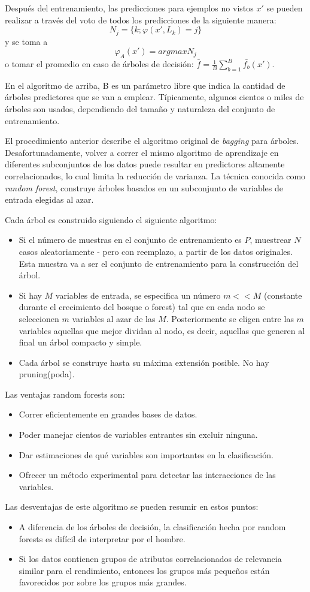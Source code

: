 	Después del entrenamiento, las predicciones para ejemplos no vistos $x'$ se pueden realizar a través del voto de todos los predicciones de la siguiente manera:
	$$N_j = \{ k;\varphi(x', L_k) = j \}$$
	y se toma a
	$$\varphi_A(x') = argmax N_j$$
	o tomar el promedio en caso de árboles de decisión: $\bar{f} = \frac{1}{B}\sum_{b=1}^B\bar{f_b}(x')$.

	En el algoritmo de arriba, B es un parámetro libre que indica la cantidad de árboles predictores que se van a emplear. Típicamente, algunos cientos o miles de árboles son usados, dependiendo del tamaño y naturaleza del conjunto de entrenamiento.

	El procedimiento anterior describe el algoritmo original de \textit{bagging} para árboles. Desafortunadamente, volver a correr el mismo algoritmo de aprendizaje en diferentes subconjuntos de los datos puede resultar en predictores altamente correlacionados, lo cual limita la reducción de varianza. La técnica conocida como \textit{random forest}, construye árboles basados en un subconjunto de variables de entrada elegidas al azar.

	Cada árbol es construido siguiendo el siguiente algoritmo:
	\begin{itemize}
		\item Si el número de muestras en el conjunto de entrenamiento es $P$, muestrear $N$ casos aleatoriamente - pero con reemplazo, a partir de los datos originales. Esta muestra va a ser el conjunto de entrenamiento para la construcción del árbol.
		\item Si hay $M$ variables de entrada, se especifica un número $m<<M$ (constante durante el crecimiento del bosque o forest) tal que en cada nodo se seleccionen $m$ variables al azar de las $M$. Posteriormente se eligen entre las $m$ variables aquellas que mejor dividan al nodo, es decir, aquellas que generen al final un árbol compacto y simple.
		\item Cada árbol se construye hasta su máxima extensión posible. No hay pruning(poda).
	\end{itemize}
	Las ventajas random forests son:
	\begin{itemize}
		\item Correr eficientemente en grandes bases de datos.
		\item Poder manejar cientos de variables entrantes sin excluir ninguna.
		\item Dar estimaciones de qué variables son importantes en la clasificación.
		\item Ofrecer un método experimental para detectar las interacciones de las variables.
	\end{itemize}
	Las desventajas de este algoritmo se pueden resumir en estos puntos:
	\begin{itemize}
		\item A diferencia de los árboles de decisión, la clasificación hecha por random forests es difícil de interpretar por el hombre.
		\item Si los datos contienen grupos de atributos correlacionados de relevancia similar para el rendimiento, entonces los grupos más pequeños están favorecidos por sobre los grupos más grandes.
	\end{itemize}
	
